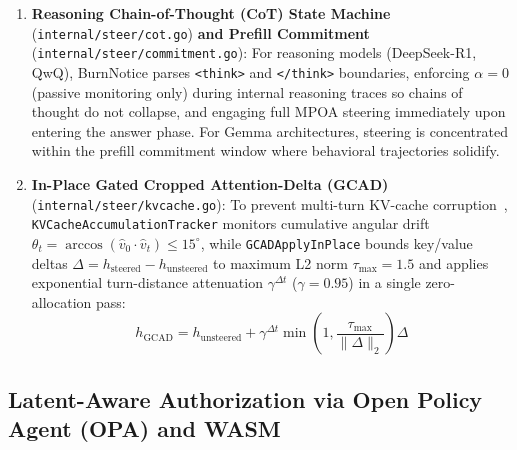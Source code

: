 \documentclass{article}
\begin{document}
\begin{enumerate}
    \item \textbf{Reasoning Chain-of-Thought (CoT) State Machine} (\texttt{internal/steer/cot.go}) \textbf{and Prefill Commitment} (\texttt{internal/steer/commitment.go}): For reasoning models (DeepSeek-R1, QwQ), BurnNotice parses \texttt{<think>} and \texttt{</think>} boundaries, enforcing $\alpha = 0$ (passive monitoring only) during internal reasoning traces so chains of thought do not collapse, and engaging full MPOA steering immediately upon entering the answer phase. For Gemma architectures, steering is concentrated within the prefill commitment window where behavioral trajectories solidify.
    \item \textbf{In-Place Gated Cropped Attention-Delta (GCAD)} (\texttt{internal/steer/kvcache.go}): To prevent multi-turn KV-cache corruption~\cite{promptactivationduality2026}, \texttt{KVCacheAccumulationTracker} monitors cumulative angular drift $\theta_t = \arccos(\hat{v}_0 \cdot \hat{v}_t) \le 15^\circ$, while \texttt{GCADApplyInPlace} bounds key/value deltas $\Delta = h_{\text{steered}} - h_{\text{unsteered}}$ to maximum L2 norm $\tau_{\max} = 1.5$ and applies exponential turn-distance attenuation $\gamma^{\Delta t}$ ($\gamma = 0.95$) in a single zero-allocation pass:
    \begin{equation}
        h_{\text{GCAD}} = h_{\text{unsteered}} + \gamma^{\Delta t} \min\!\left(1, \frac{\tau_{\max}}{\|\Delta\|_2}\right) \Delta
    \end{equation}
\end{enumerate}

\subsection{Latent-Aware Authorization via Open Policy Agent (OPA) and WASM}\label{sec:opa}
\end{document}

